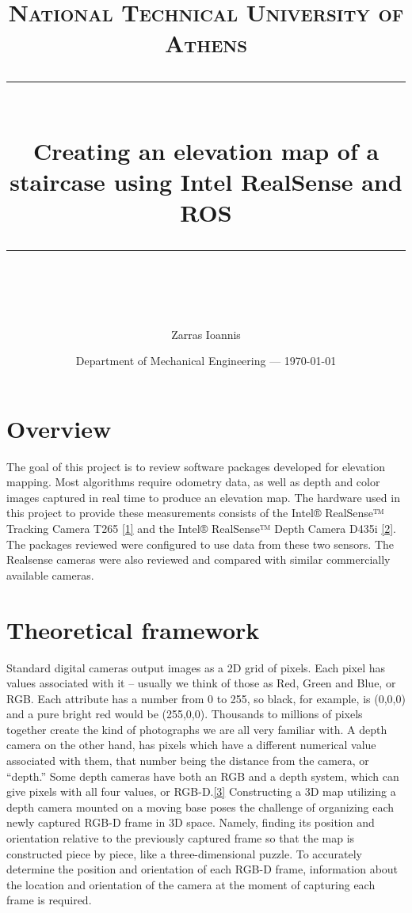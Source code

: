 \documentclass{article}
\title{	
	\normalfont\normalsize
	\textsc{National Technical University of Athens}\\ %
	\vspace{25pt} %
	\rule{\linewidth}{0.5pt}\\ %
	\vspace{20pt} %
	{\LARGE Creating an elevation map of a staircase using 
Intel RealSense and ROS}\\ %
	\vspace{12pt} %
	\rule{\linewidth}{2pt}\\ %
	\vspace{12pt} %
}
\author{\LARGE Zarras Ioannis} %
\date{Department of Mechanical Engineering --- \today}
\begin{document}
\maketitle
\tableofcontents


\section{Overview}

The goal of this project is to review software packages developed for elevation mapping. Most algorithms require odometry data, as well as depth and color images captured in real time to produce an elevation map. The hardware used in this project to provide these measurements consists of the Intel® RealSense™ Tracking Camera T265 \href{https://www.intelrealsense.com/tracking-camera-t265/}{[1]} and the  Intel® RealSense™ Depth Camera D435i \href{https://www.intelrealsense.com/depth-camera-d435i/}{[2]}. The packages reviewed were configured to use data from these two sensors. The Realsense cameras were also reviewed and compared with similar commercially available cameras.

\section{Theoretical framework}

Standard digital cameras output images as a 2D grid of pixels. Each pixel has values associated with it – usually we think of those as Red, Green and Blue, or RGB. Each attribute has a number from 0 to 255, so black, for example, is (0,0,0) and a pure bright red would be (255,0,0). Thousands to millions of pixels together create the kind of photographs we are all very familiar with. A depth camera on the other hand, has pixels which have a different numerical value associated with them, that number being the distance from the camera, or “depth.” Some depth cameras have both an RGB and a depth system, which can give pixels with all four values, or RGB-D.\href{https://www.intelrealsense.com/beginners-guide-to-depth/}{[3]} Constructing a 3D map utilizing a depth camera mounted on a moving base poses the challenge of organizing each newly captured RGB-D frame in 3D space. Namely, finding its position and orientation relative to the previously captured frame so that the map is constructed piece by piece, like a three-dimensional puzzle. To accurately determine the position and orientation of each RGB-D frame, information about the location and orientation of the camera at the moment of capturing each frame is required.
\end{document}

